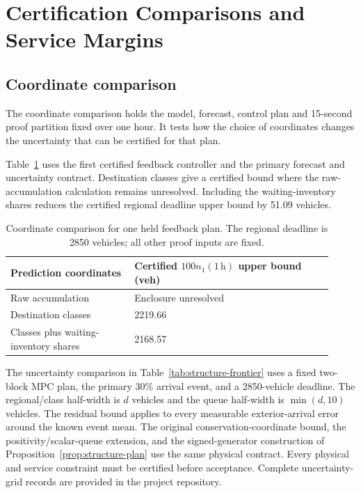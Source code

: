 \documentclass[journal,10pt]{IEEEtran}
\begin{document}
\FloatBarrier

\section{Certification Comparisons and Service Margins}
\label{sec:supp-structure}
\label{app:structure-online-details}
\subsection{Coordinate comparison}

The coordinate comparison holds the model, forecast, control plan and
15-second proof partition fixed over one hour. It tests how the choice of
coordinates changes the uncertainty that can be certified for that plan.

Table~\ref{tab:new-coordinate-ablation} uses the first certified feedback
controller and the primary forecast and uncertainty contract. Destination
classes give a certified bound where the raw-accumulation calculation
remains unresolved. Including the waiting-inventory shares reduces the
certified regional deadline upper bound by 51.09 vehicles.

\begin{table}[t]
\centering
\caption{Coordinate comparison for one held feedback plan. The regional
deadline is 2850 vehicles; all other proof inputs are fixed.}
\label{tab:new-coordinate-ablation}
\small
\begin{tabular}{@{}p{0.35\linewidth}p{0.57\linewidth}@{}}
\toprule
Prediction coordinates & Certified $100n_1(1\,\mathrm h)$ upper bound (veh)\\
\midrule
Raw accumulation & Enclosure unresolved\\
Destination classes & 2219.66\\
Classes plus waiting-inventory shares & 2168.57\\
\bottomrule
\end{tabular}
\end{table}

The uncertainty comparison in Table~\ref{tab:structure-frontier} uses a
fixed two-block MPC plan, the primary 30\% arrival event, and a
2850-vehicle deadline. The regional/class half-width is $d$ vehicles and
the queue half-width is $\min(d,10)$ vehicles. The residual bound applies
to every measurable exterior-arrival error around the known event mean.
The original conservation-coordinate bound, the positivity/scalar-queue
extension, and the signed-generator construction of
Proposition~\ref{prop:structure-plan} use the same physical contract.
Every physical and service constraint must be certified before acceptance.
Complete uncertainty-grid records are provided in the project repository.
\end{document}
